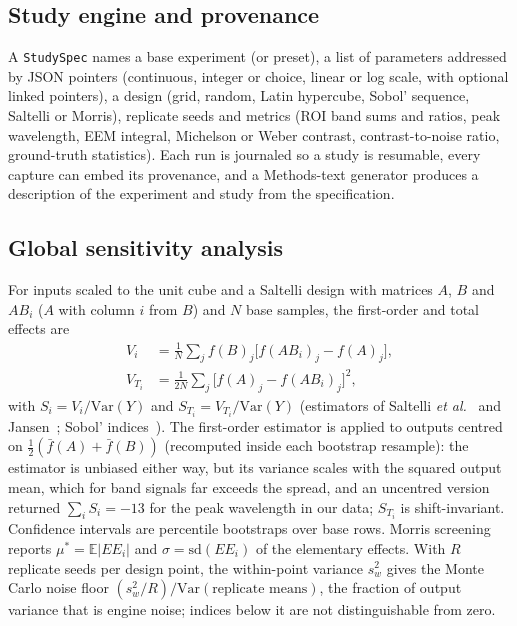 \documentclass[journal]{IEEEtran}
\begin{document}
\subsection{Study engine and provenance}
A \texttt{StudySpec} names a base experiment (or preset), a list of parameters addressed by JSON pointers (continuous, integer or choice, linear or log scale, with optional linked pointers), a design (grid, random, Latin hypercube, Sobol' sequence, Saltelli or Morris), replicate seeds and metrics (ROI band sums and ratios, peak wavelength, EEM integral, Michelson or Weber contrast, contrast-to-noise ratio, ground-truth statistics). Each run is journaled so a study is resumable, every capture can embed its provenance, and a Methods-text generator produces a description of the experiment and study from the specification.

\subsection{Global sensitivity analysis}
For inputs scaled to the unit cube and a Saltelli design with matrices $A$, $B$ and $AB_i$ ($A$ with column $i$ from $B$) and $N$ base samples, the first-order and total effects are
\begin{align}
V_i&=\frac1N\sum_{j}f(B)_j\big[f(AB_i)_j-f(A)_j\big],\label{eq:Si}\\
V_{T_i}&=\frac1{2N}\sum_{j}\big[f(A)_j-f(AB_i)_j\big]^2,\label{eq:ST}
\end{align}
with $S_i=V_i/\mathrm{Var}(Y)$ and $S_{T_i}=V_{T_i}/\mathrm{Var}(Y)$ (estimators of Saltelli \emph{et al.}~\cite{saltelli2010} and Jansen~\cite{jansen1999}; Sobol' indices~\cite{sobol2001}). The first-order estimator is applied to outputs centred on $\tfrac12(\bar f(A)+\bar f(B))$ (recomputed inside each bootstrap resample): the estimator is unbiased either way, but its variance scales with the squared output mean, which for band signals far exceeds the spread, and an uncentred version returned $\sum_i S_i=-13$ for the peak wavelength in our data; $S_{T_i}$ is shift-invariant. Confidence intervals are percentile bootstraps over base rows. Morris screening~\cite{morris1991,campolongo2007} reports $\mu^*=\mathbb E|EE_i|$ and $\sigma=\mathrm{sd}(EE_i)$ of the elementary effects. With $R$ replicate seeds per design point, the within-point variance $s_w^2$ gives the Monte Carlo noise floor $(s_w^2/R)/\mathrm{Var}(\text{replicate means})$, the fraction of output variance that is engine noise; indices below it are not distinguishable from zero.
\end{document}
